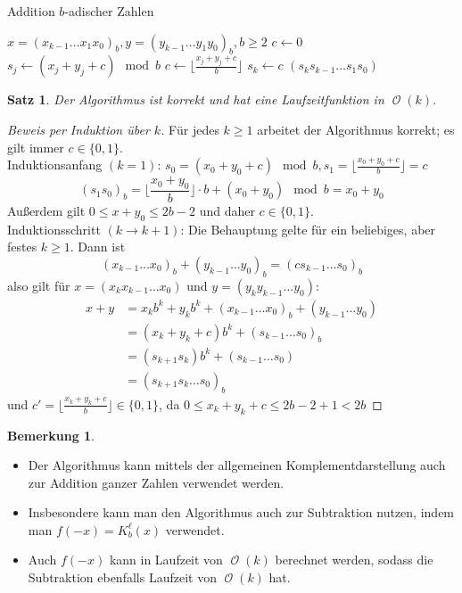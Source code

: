 \documentclass[a4paper,12pt]{article}
\DeclareMathOperator{\BigO}{\mathcal O}
\newtheorem{satz}[axiom]{Satz}
\theoremstyle{definition}
\newtheorem*{bemerkung}{Bemerkung}
\begin{document}
	\begin{algorithm}
	\caption{Addition $b$-adischer Zahlen}
		\begin{algorithmic}
			\Require $x = (x_{k-1}\dots x_1x_0)_b, y = (y_{k-1}\dots y_1y_0)_b, b\geq 2$
			\State $c \gets 0$
				\State $s_j \gets (x_j + y_j + c) \mod b$
				\State $c \gets \lfloor \frac{x_j + y_j + c}{b}\rfloor$
			\EndFor
			\State $s_k \gets c$
			\State \Return $(s_ks_{k-1}\dots s_1s_0)$
		\end{algorithmic}
	\end{algorithm}
	\begin{satz}
		Der Algorithmus ist korrekt und hat eine Laufzeitfunktion in $\BigO(k)$.
	\end{satz}
	\begin{proof}[Beweis per Induktion über $k$]
		Für jedes $k\geq 1$ arbeitet der Algorithmus korrekt; es gilt immer $c\in \{0,1\}$.\\[2ex]
		Induktionsanfang $(k = 1)$: $s_0 = (x_0 + y_0 + c) \mod b, s_1 = \lfloor \frac{x_0 + y_0 + c}{b} \rfloor = c$
		\[
			(s_1s_0)_b = \big\lfloor \frac{x_0 + y_0}{b}\big\rfloor \cdot b + (x_0 + y_0) \mod b = x_0 + y_0
		\]
		Außerdem gilt $0 \leq x + y_0 \leq 2b - 2$ und daher $c \in \{0,1\}$.\\[2ex]
		Induktionsschritt $(k \to k + 1)$:  Die Behauptung gelte für ein beliebiges, aber festes $k \geq 1$. Dann ist 
		\[
			(x_{k-1}\dots x_0)_b + (y_{k-1}\dots y_0)_b = (cs_{k-1}\dots s_0)_b
		\]
		also gilt für $x = (x_kx_{k-1}\dots x_0)$ und $y = (y_ky_{k-1}\dots y_0)$:
		\begin{align*}
			x + y &= x_kb^k + y_kb^k + (x_{k-1}\dots x_0)_b + (y_{k-1}\dots y_0)\\
			&= (x_k + y_k + c)b^k + (s_{k-1}\dots s_0)_b\\
			&= (s_{k+1}s_k)b^k + (s_{k-1}\dots s_0)\\
			&= (s_{k+1}s_k\dots s_0)_b
		\end{align*}
		und $c' = \lfloor \frac{x_k + y_k + c}{b} \rfloor \in \{0,1\}$, da $0 \leq x_k + y_k + c \leq 2b-2 + 1 < 2b$
	\end{proof}
	\begin{bemerkung}
		\begin{itemize}
			\item Der Algorithmus kann mittels der allgemeinen Komplementdarstellung auch zur Addition ganzer Zahlen verwendet werden.
			\item Insbesondere kann man den Algorithmus auch zur Subtraktion nutzen, indem man $f(-x) = K_b^\ell(x)$ verwendet.
			\item Auch $f(-x)$ kann in Laufzeit von $\BigO(k)$ berechnet werden, sodass die Subtraktion ebenfalls Laufzeit von $\BigO(k)$ hat.
		\end{itemize}
	\end{bemerkung}
\end{document}

